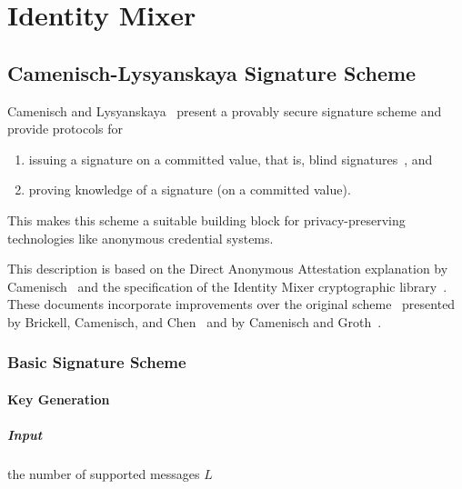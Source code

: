 \chapter{Identity Mixer}

\section{Camenisch-Lysyanskaya Signature Scheme}

Camenisch and Lysyanskaya~\cite{CamenischLysyanskaya2002,Lysyanskaya2002}
present a provably secure signature scheme and provide protocols for
\begin{enumerate}
  \item issuing a signature on a committed value, that is, blind
    signatures~\cite{Chaum1983}, and
  \item proving knowledge of a signature (on a committed value).
\end{enumerate}
This makes this scheme a suitable building block for privacy-preserving
technologies like anonymous credential systems.

This description is based on the Direct Anonymous Attestation explanation by
Camenisch~\cite{Camenisch2007} and the specification of the Identity Mixer
cryptographic library~\cite{Idemix_Crypto2010}. These documents incorporate
improvements over the original scheme~\cite{CamenischLysyanskaya2002} presented
by Brickell, Camenisch, and Chen~\cite{BrickellCC2004} and by Camenisch and
Groth~\cite{CamenischGroth2004}.

\subsection{Basic Signature Scheme}\label{sec:cl_basic}

\subsubsection{Key Generation}\label{sec:cl_basic-keygen}

\paragraph{Input}
  the number of supported messages $L$

